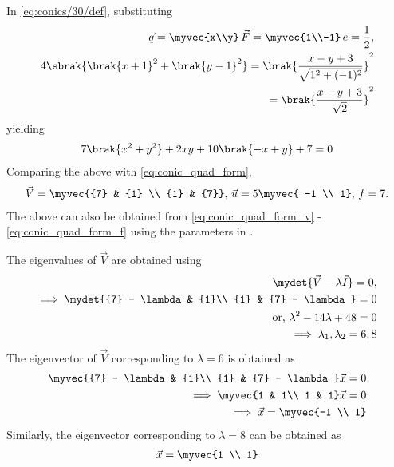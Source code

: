 In \eqref{eq:conics/30/def},
substituting
\begin{align}
\vec{q} = \myvec{x\\y}\,
\vec{F} = \myvec{1\\-1}\,
	e = \frac{1}{2},
	\\
	4\sbrak{\brak{x+1}^2 + \brak{y-1}^2}= \brak{\frac{x - y + 3}{\sqrt{1^2 + (-1)^2}}}^2\\
	= \brak{\frac{x - y + 3}{\sqrt{2}}}^2
\end{align}
yielding
\begin{align}
	7\brak{x^2+y^2} + 2xy + 10\brak{-x+y} + 7 = 0 \label{acconiceq}
\end{align}
Comparing the above with
    \eqref{eq:conic_quad_form},
\begin{align}
	\vec{V} = \myvec{{7} & {1} \\  {1} & {7}},
	\,
	\vec{u} ={5}  \myvec{ -1 \\ 1},
	\,
	f = {7}.
\end{align}
The above can also be obtained from 
  \eqref{eq:conic_quad_form_v} -
\eqref{eq:conic_quad_form_f}
using the parameters in 
	.
\begin{table}[H]    
	\centering
	
	\caption{}
	\label{tab1-1.9-6}
\end{table}
The eigenvalues of $\vec{V}$ are obtained using
	\begin{align}
		\mydet{\vec{V}  - \lambda\vec{I}}  = 0,&\\
		\implies		\mydet{{7} - \lambda& {1}\\ {1} & {7} - \lambda} =0& \\
		\text{or, }\lambda^2 - 14\lambda +48 =0&
		\\
		\implies
		\lambda_1, \lambda_2 = 6, 8&\\
	\end{align}
	The eigenvector of $\vec{V}$ corresponding to $\lambda = 6$ is obtained as
\begin{align}
	\myvec{{7} - \lambda& {1}\\ {1} & {7} - \lambda}\vec{x} =0 &\\
\implies 
	\myvec{1 & 1\\ 1 & 1}\vec{x} =0 &\\
	\implies \vec{x} = \myvec{-1 \\ 1}&
\end{align}
Similarly, the eigenvector corresponding to $\lambda = 8$ can be obtained as
\begin{align}
	\vec{x} = \myvec{1 \\ 1}
\end{align}
